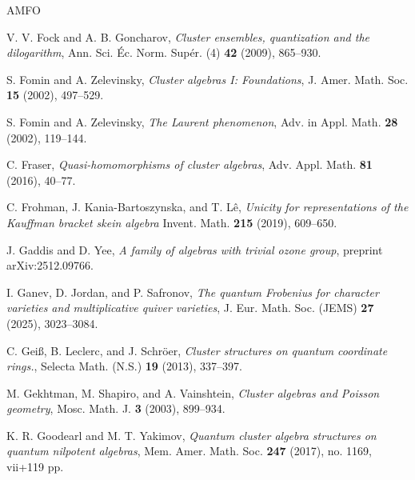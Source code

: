 \documentclass[11pt]{amsart}
\theoremstyle{plain}
\begin{document}
\begin{thebibliography}{AMFO}




 V. V. Fock and A. B. Goncharov, {\em{Cluster ensembles, quantization and the dilogarithm}}, Ann. Sci. \'Ec. Norm. Sup\'er. (4) {\bf{42}} (2009), 865--930.

 S. Fomin and A. Zelevinsky, {\em{Cluster algebras I: Foundations}}, J. Amer. Math. Soc. \textbf{15} (2002), 497--529.

 S. Fomin and A. Zelevinsky, {\em{The Laurent phenomenon}}, Adv. in Appl. Math. \textbf{28} (2002), 119--144.

 C. Fraser, {\em{Quasi-homomorphisms of cluster algebras}}, Adv. Appl. Math. {\bf{81}} (2016), 40--77.

 C. Frohman, J. Kania-Bartoszynska, and T. L\^{e},
{\em{Unicity for representations of the Kauffman bracket skein algebra}}
Invent. Math. {\bf{215}} (2019), 609--650.

 J. Gaddis and D. Yee, {\em{A family of algebras with trivial ozone group}}, preprint arXiv:2512.09766.

 I. Ganev, D. Jordan, and P. Safronov, {\em{The quantum Frobenius for character varieties and multiplicative quiver varieties}}, J. Eur. Math. Soc. (JEMS) {\bf{27}} (2025), 3023--3084.

 C. Gei\ss, B. Leclerc, and J. Schr\"oer, 
{\em{Cluster structures on quantum coordinate rings.}}, Selecta Math. (N.S.) {\bf{19}} (2013), 337--397.

 M. Gekhtman, M. Shapiro, and A. Vainshtein, {\em{Cluster algebras and Poisson geometry}}, Mosc. Math. J. {\bf{3}} (2003), 899--934.

 K. R. Goodearl and M. T. Yakimov, {\em{Quantum cluster algebra structures on quantum nilpotent algebras}}, Mem. Amer. Math. Soc. {\bf{247}} (2017), no. 1169, vii+119 pp.


\end{thebibliography}
\end{document}
